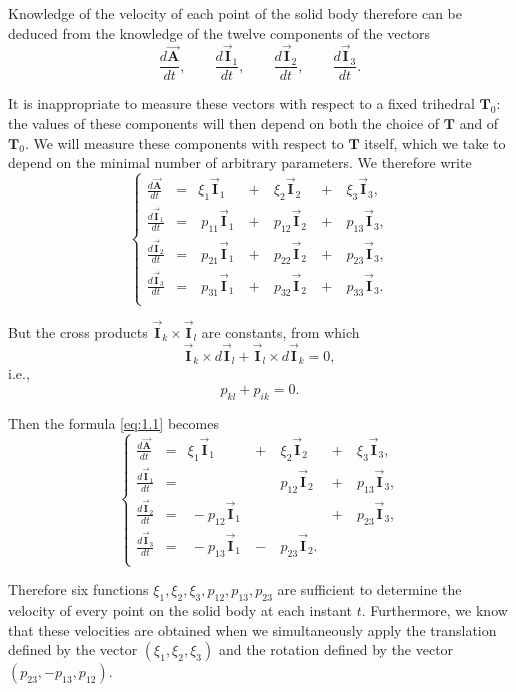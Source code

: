 \documentclass[leqno,11pt]{book}
\numberwithin{equation}{chapter}
\theoremstyle{shape1}
\theoremstyle{shapesmall}
\newcommand{\rvec}[1]{\vec{\mathbf{#1}}}
\newcommand{\ivec}{\rvec{I}}
\begin{document}
Knowledge of the velocity of each point of the solid body therefore can be deduced from the knowledge of the twelve components of the vectors
\[
\frac{d{\rvec{A}}}{dt},\qquad\frac{d\ivec_{1}}{dt},\qquad\frac{d\ivec_{2}}{dt},\qquad\frac{d\ivec_{3}}{dt}.
\]

It is inappropriate to measure these vectors with respect to a fixed trihedral $\mathbf{T}_{0}$: the values of these components will then depend on both the choice of $\mathbf{T}$ and of $\mathbf{T}_{0}$. We will measure these components with respect to $\mathbf{T}$ itself, which we take to depend on the minimal number of arbitrary parameters. We therefore write
\begin{equation}
  \label{eq:1.1}
  \left\{
    \begin{alignedat}{6}
      \frac{d{\rvec{A}}}{dt}&=&\xi_{1}\ivec_{1}&\ +\ &\xi_{2}\ivec_{2}&\ +\ &\xi_{3}\ivec_{3},\\
      \frac{d\ivec_{1}}{dt}&=&\ p_{11}\ivec_{1}&\ +\ &p_{12}\ivec_{2}&\ +\ &p_{13}\ivec_{3},\\
      \frac{d\ivec_{2}}{dt}&=&\ p_{21}\ivec_{1}&\ +\ &p_{22}\ivec_{2}&\ +\ &p_{23}\ivec_{3},\\
      \frac{d\ivec_{3}}{dt}&=&\ p_{31}\ivec_{1}&\ +\ &p_{32}\ivec_{2}&\ +\ &p_{33}\ivec_{3}.\\
    \end{alignedat}
  \right.
\end{equation}

But the cross products $\ivec_{k}\times\ivec_{l}$ are constants, from which
\[
\ivec_{k}\times d\ivec_{l}+\ivec_{l}\times d\ivec_{k}=0,
\]
i.e.,
\[
p_{kl}+p_{ik}=0.
\]

Then the formula \eqref{eq:1.1} becomes
\begin{equation}
  \label{eq:1.2}
  \left\{
    \begin{alignedat}{6}
      \frac{d{\rvec{A}}}{dt}&=&\xi_{1}\ivec_{1}&\ +\ &\xi_{2}\ivec_{2}&\ +\ &\xi_{3}\ivec_{3},\\
      \frac{d\ivec_{1}}{dt}&=&&&p_{12}\ivec_{2}&\ +\ &p_{13}\ivec_{3},\\
      \frac{d\ivec_{2}}{dt}&=&\ -p_{12}\ivec_{1}& &&\ +\ &p_{23}\ivec_{3},\\
      \frac{d\ivec_{3}}{dt}&=&\ -p_{13}\ivec_{1}&\ -\ &p_{23}\ivec_{2}.\\
    \end{alignedat}
  \right.
\end{equation}

Therefore six functions $\xi_{1},\xi_{2}, \xi_{3},p_{12},p_{13},p_{23}$ are sufficient to determine the velocity of every point on the solid body at each instant $t$. Furthermore, we know that these velocities are obtained when we simultaneously apply the translation defined by the vector $(\xi_{1},\xi_{2},\xi_{3})$ and the rotation defined by the vector $(p_{23},-p_{13},p_{12})$.
\end{document}
